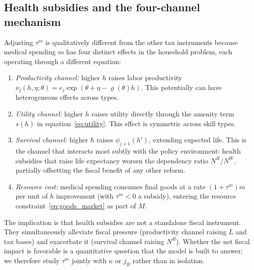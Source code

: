 \documentclass[12pt,a4paper]{article}
\begin{document}
\subsection{Health subsidies and the four-channel mechanism}
\label{subsec:policy_health}

 
Adjusting $\tau^m$ is qualitatively different from the other tax instruments because medical spending $m$ has four distinct effects in the household problem, each operating through a different equation:
 
\begin{enumerate}
\item \emph{Productivity channel:} higher $h$ raises labor productivity $\nu_j(h, \eta; \theta) = e_j \exp(\theta + \eta - \varrho(\theta) h)$. This potentially can have heterogeneous effects across types.
\item \emph{Utility channel:} higher $h$ raises utility directly through the amenity term $s(h)$ in equation~\eqref{eq:utility}. This effect is symmetric across skill types.
\item \emph{Survival channel:} higher $h$ raises $\psi_{j+1}(h')$, extending expected life. This is the channel that interacts most subtly with the policy environment: health subsidies that raise life expectancy worsen the dependency ratio $N^R/N^W$, partially offsetting the fiscal benefit of any other reform. 
\item \emph{Resource cost:} medical spending consumes final goods at a rate $(1+\tau^m)m$ per unit of $h$ improvement (with $\tau^m < 0$ a subsidy), entering the resource constraint~\eqref{eq:goods_market} as part of $M$.
\end{enumerate}
 
The implication is that health subsidies are not a standalone fiscal instrument. They simultaneously alleviate fiscal pressure (productivity channel raising $L$ and tax bases) and exacerbate it (survival channel raising $N^R$). Whether the net fiscal impact is favorable is a quantitative question that the model is built to answer; we therefore study $\tau^m$ jointly with $\kappa$ or $j_R$ rather than in isolation.
\end{document}
